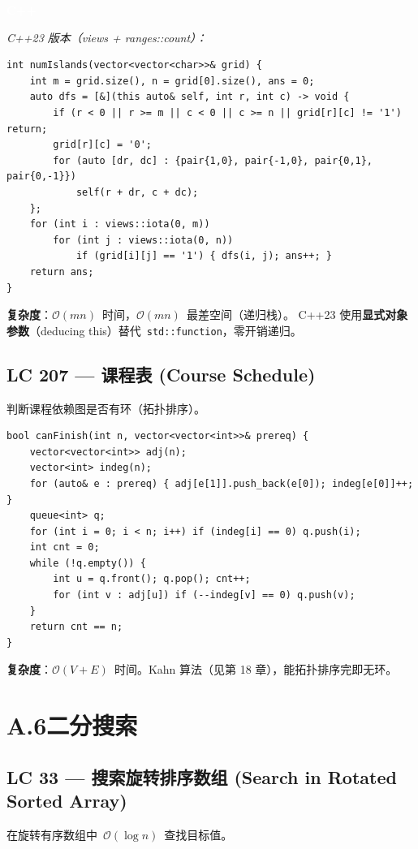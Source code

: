 \documentclass[12pt,a4paper,fontset=fandol]{ctexbook}
\newcommand{\cpplabel}{%
  \noindent\begin{tcolorbox}[sharp corners,colback=cppheadbg,colframe=cppheadbg,
    left=6pt,right=6pt,top=2pt,bottom=2pt,boxrule=0pt]
  \textcolor{white}{\small\bfseries\sffamily C++}\end{tcolorbox}%
}
\newcommand{\bigO}[1]{\mathcal{O}(#1)}
\newcommand{\Tp}[1]{\texttt{#1}}
\begin{document}
\cpplabel\noindent\textit{C++23 版本（views + ranges::count）：}
\begin{lstlisting}[style=cppstyle]
int numIslands(vector<vector<char>>& grid) {
    int m = grid.size(), n = grid[0].size(), ans = 0;
    auto dfs = [&](this auto& self, int r, int c) -> void {
        if (r < 0 || r >= m || c < 0 || c >= n || grid[r][c] != '1') return;
        grid[r][c] = '0';
        for (auto [dr, dc] : {pair{1,0}, pair{-1,0}, pair{0,1}, pair{0,-1}})
            self(r + dr, c + dc);
    };
    for (int i : views::iota(0, m))
        for (int j : views::iota(0, n))
            if (grid[i][j] == '1') { dfs(i, j); ans++; }
    return ans;
}
\end{lstlisting}
\textbf{复杂度}：$\bigO{mn}$~时间，$\bigO{mn}$~最差空间（递归栈）。
C++23 使用\textbf{显式对象参数}（deducing this）替代~\Tp{std::function}，零开销递归。

\subsection*{LC 207 — 课程表 (Course Schedule)}

判断课程依赖图是否有环（拓扑排序）。

\begin{lstlisting}[style=cppstyle]
bool canFinish(int n, vector<vector<int>>& prereq) {
    vector<vector<int>> adj(n);
    vector<int> indeg(n);
    for (auto& e : prereq) { adj[e[1]].push_back(e[0]); indeg[e[0]]++; }
    queue<int> q;
    for (int i = 0; i < n; i++) if (indeg[i] == 0) q.push(i);
    int cnt = 0;
    while (!q.empty()) {
        int u = q.front(); q.pop(); cnt++;
        for (int v : adj[u]) if (--indeg[v] == 0) q.push(v);
    }
    return cnt == n;
}
\end{lstlisting}
\textbf{复杂度}：$\bigO{V+E}$~时间。Kahn 算法（见第 18 章），能拓扑排序完即无环。

\section*{A.6\quad 二分搜索}

\subsection*{LC 33 — 搜索旋转排序数组 (Search in Rotated Sorted Array)}

在旋转有序数组中~$\bigO{\log n}$~查找目标值。
\end{document}
